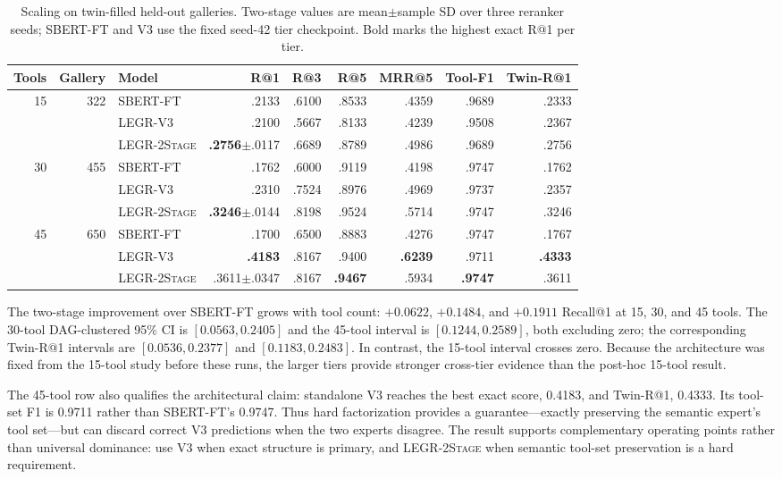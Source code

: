 \documentclass{article}
\makeatletter
\newcommand{\method}{\textsc{LEGR-2Stage}}
\newcommand{\sbert}{\textsc{SBERT-FT}}
\newcommand{\vthree}{\textsc{LEGR-V3}}
\newcommand{\Rone}{R@1}
\newcommand{\Rthree}{R@3}
\newcommand{\Rfive}{R@5}
\newcommand{\toolF}{Tool-F1}
\newcommand{\twR}{Twin-R@1}
\makeatother
\begin{document}
\begin{table}[t]
\caption{Scaling on twin-filled held-out galleries. Two-stage values are mean$\pm$sample SD over three reranker seeds; SBERT-FT and V3 use the fixed seed-42 tier checkpoint. Bold marks the highest exact R@1 per tier.}
\label{tab:scaling}
\centering
\small
\begin{tabular}{rrlrrrrrr}
\toprule
Tools & Gallery & Model & \Rone{} & \Rthree{} & \Rfive{} & MRR@5 & \toolF{} & \twR{} \\
\midrule
15 & 322 & \sbert{} & .2133 & .6100 & .8533 & .4359 & .9689 & .2333 \\
   &     & \vthree{} & .2100 & .5667 & .8133 & .4239 & .9508 & .2367 \\
   &     & \method{} & \textbf{.2756}$\pm$.0117 & .6689 & .8789 & .4986 & .9689 & .2756 \\
\midrule
30 & 455 & \sbert{} & .1762 & .6000 & .9119 & .4198 & .9747 & .1762 \\
   &     & \vthree{} & .2310 & .7524 & .8976 & .4969 & .9737 & .2357 \\
   &     & \method{} & \textbf{.3246}$\pm$.0144 & .8198 & .9524 & .5714 & .9747 & .3246 \\
\midrule
45 & 650 & \sbert{} & .1700 & .6500 & .8883 & .4276 & .9747 & .1767 \\
   &     & \vthree{} & \textbf{.4183} & .8167 & .9400 & \textbf{.6239} & .9711 & \textbf{.4333} \\
   &     & \method{} & .3611$\pm$.0347 & .8167 & \textbf{.9467} & .5934 & \textbf{.9747} & .3611 \\
\bottomrule
\end{tabular}
\end{table}

The two-stage improvement over \sbert{} grows with tool count: $+0.0622$, $+0.1484$, and $+0.1911$ Recall@1 at 15, 30, and 45 tools.
The 30-tool DAG-clustered 95\% CI is $[0.0563,0.2405]$ and the 45-tool interval is $[0.1244,0.2589]$, both excluding zero; the corresponding Twin-R@1 intervals are $[0.0536,0.2377]$ and $[0.1183,0.2483]$.
In contrast, the 15-tool interval crosses zero.
Because the architecture was fixed from the 15-tool study before these runs, the larger tiers provide stronger cross-tier evidence than the post-hoc 15-tool result.

The 45-tool row also qualifies the architectural claim: standalone V3 reaches the best exact score, 0.4183, and Twin-R@1, 0.4333.
Its tool-set F1 is 0.9711 rather than SBERT-FT's 0.9747.
Thus hard factorization provides a guarantee---exactly preserving the semantic expert's tool set---but can discard correct V3 predictions when the two experts disagree.
The result supports complementary operating points rather than universal dominance: use V3 when exact structure is primary, and \method{} when semantic tool-set preservation is a hard requirement.
\end{document}
